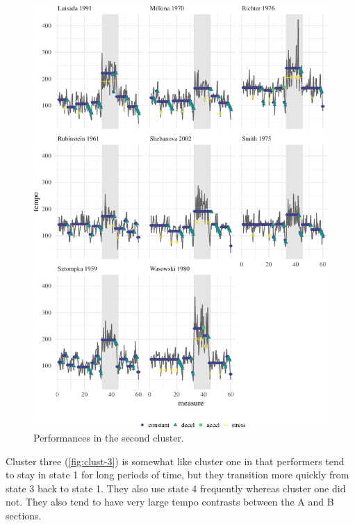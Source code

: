 \documentclass[12pt]{article}
\begin{document}
\begin{figure}

{\centering \includegraphics{gfx/clust-2-1} 

}

\caption{Performances in the second cluster.}\label{fig:clust-2}
\end{figure}

Cluster three (\autoref{fig:clust-3}) is somewhat like cluster one in
that performers tend to stay in state 1 for long periods of time, but
they transition more quickly from state 3 back to state 1. They also use
state 4 frequently whereas cluster one did not. They also tend to have
very large tempo contrasts between the A and B sections.
\end{document}
